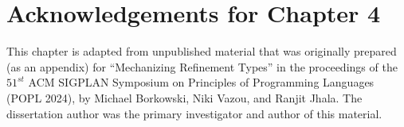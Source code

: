 \section*{Acknowledgements for Chapter 4}
%
This chapter is adapted from 
unpublished material that was originally
prepared (as an appendix) 
for ``Mechanizing Refinement Types'' in the proceedings of the 
$51^{st}$ ACM SIGPLAN Symposium on Principles of Programming
Languages (POPL 2024), by Michael Borkowski, Niki Vazou, and
Ranjit Jhala.
%
The dissertation author was the primary investigator 
and author of this material.








